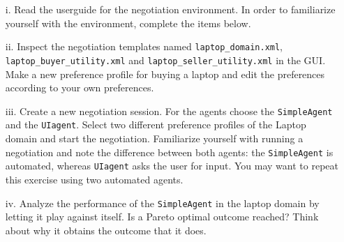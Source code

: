 \documentclass[a4paper]{article}
\begin{document}
\begin{enumerate}
    \item[i.] Read the userguide for the negotiation environment. In order to familiarize yourself with the environment, complete the items below.
	\item[ii.] Inspect the negotiation templates named \verb|laptop_domain.xml|, \verb|laptop_buyer_utility.xml| and \verb|laptop_seller_utility.xml| in the GUI. Make a new preference profile for buying a laptop and edit the preferences according to your own preferences.
	\item[iii.] Create a new negotiation session. For the agents choose the \verb|SimpleAgent| and the \verb|UIagent|. Select two different preference profiles of the Laptop domain and start the negotiation. Familiarize yourself with running a negotiation and note the difference between both agents: the \verb|SimpleAgent| is automated, whereas  \verb|UIagent| asks the user for input. You may want to repeat this exercise using two automated agents.
	\item[iv.] Analyze the performance of the \verb|SimpleAgent| in the laptop domain by letting it play against itself. Is a Pareto optimal outcome reached? Think about why it obtains the outcome that it does.


\end{enumerate}
\end{document}
